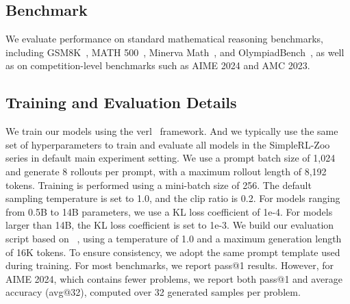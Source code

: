 \subsection{Benchmark} 
We evaluate performance on standard mathematical reasoning benchmarks, including GSM8K~\citep{cobbe2021training}, MATH 500~\citep{hendrycks2021measuring}, Minerva Math~\citep{lewkowycz2022solving}, and OlympiadBench~\citep{he2024olympiadbench}, as well as on competition-level benchmarks such as AIME 2024 and AMC 2023. 

\subsection{Training and Evaluation Details}

\label{sec:train_evaluate_details}
We train our models using the verl~\citep{sheng2024hybridflow} framework. And we typically use the same set of hyperparameters to train and evaluate all models in the SimpleRL-Zoo series in default main experiment setting. We use a prompt batch size of 1,024 and generate 8 rollouts per prompt, with a maximum rollout length of 8,192 tokens. Training is performed using a mini-batch size of 256. The default sampling temperature is set to 1.0, and the clip ratio is 0.2. For models ranging from 0.5B to 14B parameters, we use a KL loss coefficient of 1e-4. For models larger than 14B, the KL loss coefficient is set to 1e-3. We build our evaluation script based on ~\citet{yang2024qwen2math}, using a temperature of 1.0 and a maximum generation length of 16K tokens. To ensure consistency, we adopt the same prompt template used during training. For most benchmarks, we report pass@1 results. However, for AIME 2024, which contains fewer problems, we report both pass@1 and average accuracy (avg@32), computed over 32 generated samples per problem.


